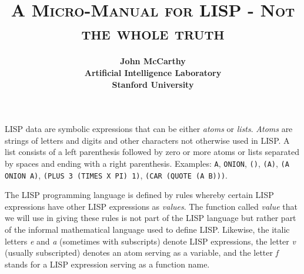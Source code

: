 \documentclass[8pt,letter,twocolumn]{article}
\title{\small \textbf{\textsc{{A Micro-Manual for LISP - Not the whole truth}}}}
\author{\footnotesize \bfseries John McCarthy\\
            \footnotesize \bfseries Artificial Intelligence Laboratory\\
            \footnotesize \bfseries Stanford University}
\date{}
\begin{document}
\setcounter{page}{215}
\maketitle


LISP data are symbolic expressions that can be either \textit{atoms} or
\textit{lists}. \textit{Atoms} are strings of letters and digits and other
characters not otherwise used in LISP. A list consists of a left parenthesis
followed by zero or more atoms or lists separated by spaces and ending with a
right parenthesis. Examples: \texttt{A}, \texttt{ONION}, \texttt{()},
\texttt{(A)}, \texttt{(A ONION A)}, \texttt{(PLUS 3 (TIMES X PI) 1)},
\texttt{(CAR (QUOTE (A B)))}.

The LISP programming language is defined by rules whereby certain LISP
expressions have other LISP expressions as \textit{values}. The function called
\textit{value} that we will use in giving these rules is not part of the LISP
language but rather part of the informal mathematical language used to define
LISP. Likewise, the italic letters \textit{e} and \textit{a} (sometimes with
subscripts) denote LISP expressions, the letter \textit{v} (usually subscripted)
denotes an atom serving as a variable, and the letter \textit{f} stands for a
LISP expression serving as a function name.
\end{document}
